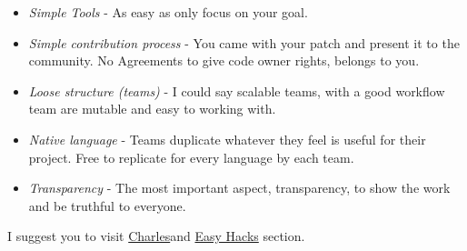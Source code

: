 \begin{itemize}
	\item \textit{Simple Tools} - As easy as only focus on your goal.
	\item \textit{Simple contribution process} - You came with your patch and present it to the community. No Agreements to give code owner rights, belongs to you.
	\item \textit{Loose structure (teams) }- I could say scalable teams, with a good workflow team are mutable and easy to working with.
	\item \textit{Native language} - Teams duplicate whatever they feel is useful for their project. Free to replicate for every language by each team.
	\item \textit{Transparency} - The most important aspect, transparency, to show the work and be truthful to everyone.
\end{itemize}I suggest you to visit \href{http://standardsandfreedom.net/}{Charles}\nolinebreakwebsite and \href{https://wiki.documentfoundation.org/Development#Finding_a_first_task:_Easy_Hacks}{Easy Hacks} section.